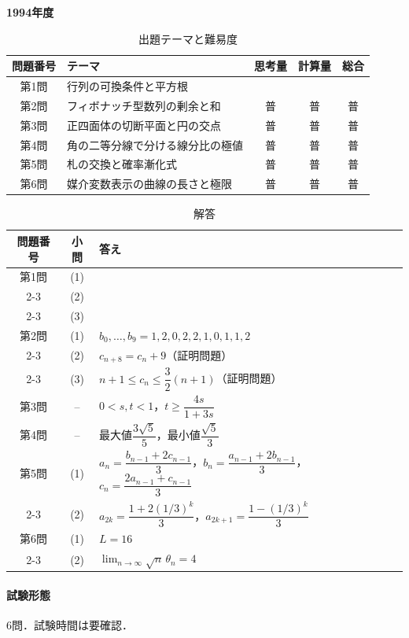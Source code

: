 \documentclass[../../main.tex]{subfiles}
\begin{document}
\begin{center}
  {\fontsize{48pt}{58pt}\selectfont \textbf{1994}\normalsize\textbf{年度}}
\end{center}

\begin{table}[htb]
  \centering
  \caption{出題テーマと難易度}
  \begin{tabular}{|c|p{6.2cm}|c|c|c|}
    \hline
    \textbf{問題番号} & \textbf{テーマ} & \textbf{思考量} & \textbf{計算量} & \textbf{総合} \\
    \hline
    第1問 & 行列の可換条件と平方根 &  &  &  \\
    \hline
    第2問 & フィボナッチ型数列の剰余と和 & 普 & 普 & 普 \\
    \hline
    第3問 & 正四面体の切断平面と円の交点 & 普 & 普 & 普 \\
    \hline
    第4問 & 角の二等分線で分ける線分比の極値 & 普 & 普 & 普 \\
    \hline
    第5問 & 札の交換と確率漸化式 & 普 & 普 & 普 \\
    \hline
    第6問 & 媒介変数表示の曲線の長さと極限 & 普 & 普 & 普 \\
    \hline
  \end{tabular}
\end{table}

\begin{table}[htb]
  \centering
  \caption{解答}
  \renewcommand{\arraystretch}{1.4}
  \begin{tabular}{|c|c|p{9cm}|}
    \hline
    \textbf{問題番号} & \textbf{小問} & \textbf{答え} \\
    \hline
    第1問 & (1) &  \\
    \cline{2-3}
    & (2) &  \\
    \cline{2-3}
    & (3) &  \\
    \hline
    第2問 & (1) & $b_0,\ldots,b_9=1,2,0,2,2,1,0,1,1,2$ \\
    \cline{2-3}
    & (2) & $c_{n+8}=c_n+9$（証明問題） \\
    \cline{2-3}
    & (3) & $n+1\le c_n\le\dfrac{3}{2}(n+1)$（証明問題） \\
    \hline
    第3問 & -- & $0<s,t<1$，$t\ge\dfrac{4s}{1+3s}$ \\
    \hline
    第4問 & -- & 最大値$\dfrac{3\sqrt{5}}{5}$，最小値$\dfrac{\sqrt{5}}{3}$ \\
    \hline
    第5問 & (1) & $a_n=\dfrac{b_{n-1}+2c_{n-1}}{3}$，$b_n=\dfrac{a_{n-1}+2b_{n-1}}{3}$，$c_n=\dfrac{2a_{n-1}+c_{n-1}}{3}$ \\
    \cline{2-3}
    & (2) & $a_{2k}=\dfrac{1+2(1/3)^k}{3}$，$a_{2k+1}=\dfrac{1-(1/3)^k}{3}$ \\
    \hline
    第6問 & (1) & $L=16$ \\
    \cline{2-3}
    & (2) & $\lim_{n\to\infty}\sqrt{n}\,\theta_n=4$ \\
    \hline
  \end{tabular}
\end{table}

\paragraph{試験形態}
6問．試験時間は要確認．
\end{document}
